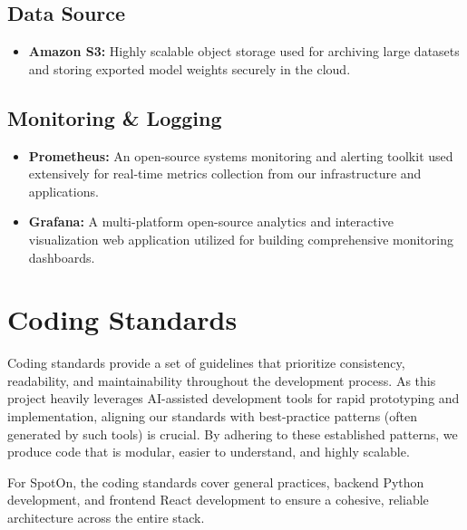 \subsection{Data Source}
\begin{itemize}[leftmargin=80pt]
    \item \textbf{Amazon S3:} Highly scalable object storage used for archiving large datasets and storing exported model weights securely in the cloud.
\end{itemize}

\subsection{Monitoring \& Logging}
\begin{itemize}[leftmargin=80pt]
    \item \textbf{Prometheus:} An open-source systems monitoring and alerting toolkit used extensively for real-time metrics collection from our infrastructure and applications.
    \item \textbf{Grafana:} A multi-platform open-source analytics and interactive visualization web application utilized for building comprehensive monitoring dashboards.
\end{itemize}

\section{Coding Standards}
\label{section:coding-standards}

Coding standards provide a set of guidelines that prioritize consistency, readability, and maintainability throughout the development process. As this project heavily leverages AI-assisted development tools for rapid prototyping and implementation, aligning our standards with best-practice patterns (often generated by such tools) is crucial. By adhering to these established patterns, we produce code that is modular, easier to understand, and highly scalable.

For SpotOn, the coding standards cover general practices, backend Python development, and frontend React development to ensure a cohesive, reliable architecture across the entire stack.

